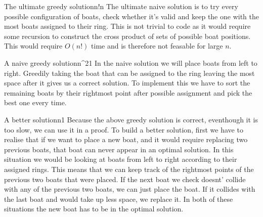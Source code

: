 \documentclass{writeup}
\begin{document}

\begin{solutions}
  \begin{solution}{The ultimate greedy solution}{n!}{n}
    The ultimate naive solution is to try every possible configuration of boats, check whether it's valid and keep the one with the most boats assigned to their ring.
    This is not trivial to code as it would require some recursion to construct the cross product of sets of possible boat positions.
    This would require $O(n!)$ time and is therefore not feasable for large $n$.
  \end{solution}
  
  \begin{solution}{A naive greedy solution}{n^2}{1}
    In the naive solution we will place boats from left to right.
    Greedily taking the boat that can be assigned to the ring leaving the most space after it gives us a correct solution.
    To implement this we have to sort the remaining boats by their rightmost point after possible assignment and pick the best one every time.

  \end{solution}

  \begin{solution}{A better solution}{n}{1}
    Because the above greedy solution is correct, eventhough it is too slow, we can use it in a proof.
    To build a better solution, first we have to realise that if we want to place a new boat, and it would require replacing two previous boats, that boat can never appear in an optimal solution.
    In this situation we would be looking at boats from left to right according to their assigned rings.
    This means that we can keep track of the rightmost points of the previous two boats that were placed.
    If the next boat we check doesnt' collide with any of the previous two boats, we can just place the boat.
    If it collides with the last boat and would take up less space, we replace it.
    In both of these situations the new boat has to be in the optimal solution.
  \end{solution}
\end{solutions}
\end{document}
